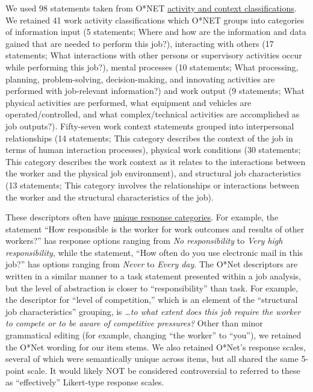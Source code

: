 \documentclass[
  english,
  man]{apa6}
\begin{document}
We used 98 statements taken from O*NET \href{https://www.ONETonline.org/find/descriptor/result/4.A.1.b.3}{activity and context classifications}. We retained 41 work activity classifications which O*NET groups into categories of information input (5 statements; Where and how are the information and data gained that are needed to perform this job?), interacting with others (17 statements; What interactions with other persons or supervisory activities occur while performing this job?), mental processes (10 statements; What processing, planning, problem-solving, decision-making, and innovating activities are performed with job-relevant information?) and work output (9 statements; What physical activities are performed, what equipment and vehicles are operated/controlled, and what complex/technical activities are accomplished as job outputs?). Fifty-seven work context statements grouped into interpersonal relationships (14 statements; This category describes the context of the job in terms of human interaction processes), physical work conditions (30 statements; This category describes the work context as it relates to the interactions between the worker and the physical job environment), and structural job characteristics (13 statements; This category involves the relationships or interactions between the worker and the structural characteristics of the job).

These descriptors often have \href{https://www.ONETonline.org/find/descriptor/result/4.C.1.c.2}{unique response categories}. For example, the statement ``How responsible is the worker for work outcomes and results of other workers?'' has response options ranging from \emph{No responsibility} to \emph{Very high responsibility}, while the statement, ``How often do you use electronic mail in this job?'' has options ranging from \emph{Never} to \emph{Every day}. The O*Net descriptors are written in a similar manner to a task statement presented within a job analysis, but the level of abstraction is closer to ``responsibility'' than task. For example, the descriptor for ``level of competition,'' which is an element of the ``structural job characteristics'' grouping, is \emph{\ldots to what extent does this job require the worker to compete or to be aware of competitive pressures?} Other than minor grammatical editing (for example, changing ``the worker'' to ``you''), we retained the O*Net wording for our item stems. We also retained O*Net's response scales, several of which were semantically unique across items, but all shared the same 5-point scale. It would likely NOT be considered controversial to referred to these as ``effectively'' Likert-type response scales.
\end{document}
